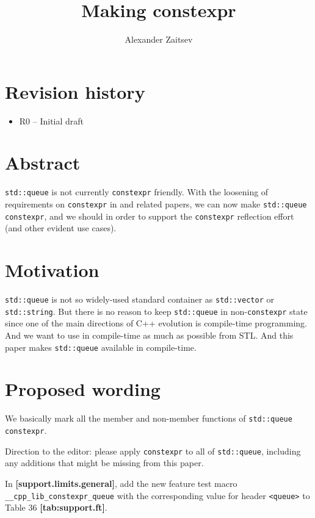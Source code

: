 \documentclass{wg21}
\title{Making \cc{std::queue} constexpr}
\author{Alexander Zaitsev}{zamazan4ik@tut.by, zamazan4ik@gmail.com}
\newcommand{\cc}[1]{\texttt{#1}}
\begin{document}
\maketitle

\section{Revision history}
\begin{itemize}
  \item R0 -- Initial draft
\end{itemize}


\section{Abstract}
\cc{std::queue} is not currently \cc{constexpr} friendly. With the loosening
of requirements on \cc{constexpr} in \cite{P0784R1} and related papers, we
can now make \cc{std::queue} \cc{constexpr}, and we should in order to support
the \cc{constexpr} reflection effort (and other evident use cases).

\section{Motivation}
\cc{std::queue} is not so widely-used standard container as \cc{std::vector} or \cc{std::string}. But there is no reason to keep \cc{std::queue} in non-\cc{constexpr} state since one of the main directions of C++ evolution is compile-time programming. And we want to use in compile-time as much as possible from STL. And this paper makes \cc{std::queue} available in compile-time.

\section{Proposed wording}
We basically mark all the member and non-member functions of \cc{std::queue} \cc{constexpr}.

Direction to the editor: please apply \cc{constexpr} to all of \cc{std::queue},
including any additions that might be missing from this paper.

In \textbf{[support.limits.general]}, add the new feature test macro
\cc{__cpp_lib_constexpr_queue} with the corresponding value for header
\cc{<queue>} to Table 36 \textbf{[tab:support.ft]}.
\end{document}

